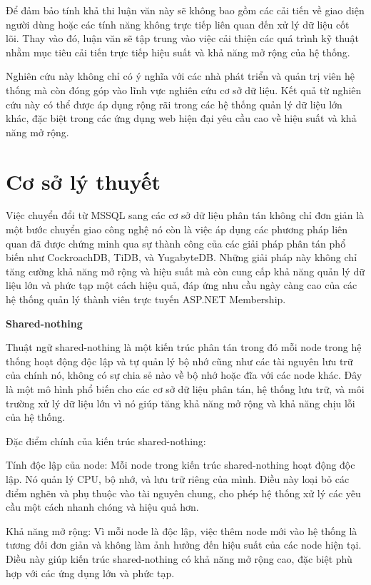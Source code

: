\documentclass[14pt]{article}
\begin{document}
Để đảm bảo tính khả thi luận văn này sẽ không bao gồm các cải tiến về giao diện người dùng hoặc các tính năng không trực tiếp liên quan đến xử lý dữ liệu cốt lõi. Thay vào đó, luận văn sẽ tập trung vào việc cải thiện các quá trình kỹ thuật nhằm mục tiêu cải tiến trực tiếp hiệu suất và khả năng mở rộng của hệ thống.


Nghiên cứu này không chỉ có ý nghĩa với các nhà phát triển và quản trị viên hệ thống mà còn đóng góp vào lĩnh vực nghiên cứu cơ sở dữ liệu. Kết quả từ nghiên cứu này có thể được áp dụng rộng rãi trong các hệ thống quản lý dữ liệu lớn khác, đặc biệt trong các ứng dụng web hiện đại yêu cầu cao về hiệu suất và khả năng mở rộng.

\section{Cơ sở lý thuyết}
Việc chuyển đổi từ MSSQL sang các cơ sở dữ liệu phân tán không chỉ đơn giản là một bước chuyển giao công nghệ nó còn là việc áp dụng các phương pháp liên quan đã được chứng minh qua sự thành công của các giải pháp phân tán phổ biến như CockroachDB, TiDB, và YugabyteDB. Những giải pháp này không chỉ tăng cường khả năng mở rộng và hiệu suất mà còn cung cấp khả năng quản lý dữ liệu lớn và phức tạp một cách hiệu quả, đáp ứng nhu cầu ngày càng cao của các hệ thống quản lý thành viên trực tuyến ASP.NET Membership.

\textbf{Shared-nothing}

Thuật ngữ shared-nothing là một kiến trúc phân tán trong đó mỗi node trong hệ thống hoạt động độc lập và tự quản lý bộ nhớ cũng như các tài nguyên lưu trữ của chính nó, không có sự chia sẻ nào về bộ nhớ hoặc đĩa với các node khác. Đây là một mô hình phổ biến cho các cơ sở dữ liệu phân tán, hệ thống lưu trữ, và môi trường xử lý dữ liệu lớn vì nó giúp tăng khả năng mở rộng và khả năng chịu lỗi của hệ thống.


Đặc điểm chính của kiến trúc shared-nothing:

Tính độc lập của node: Mỗi node trong kiến trúc shared-nothing hoạt động độc lập. Nó quản lý CPU, bộ nhớ, và lưu trữ riêng của mình. Điều này loại bỏ các điểm nghẽn và phụ thuộc vào tài nguyên chung, cho phép hệ thống xử lý các yêu cầu một cách nhanh chóng và hiệu quả hơn.

Khả năng mở rộng: Vì mỗi node là độc lập, việc thêm node mới vào hệ thống là tương đối đơn giản và không làm ảnh hưởng đến hiệu suất của các node hiện tại. Điều này giúp kiến trúc shared-nothing có khả năng mở rộng cao, đặc biệt phù hợp với các ứng dụng lớn và phức tạp.
\end{document}
